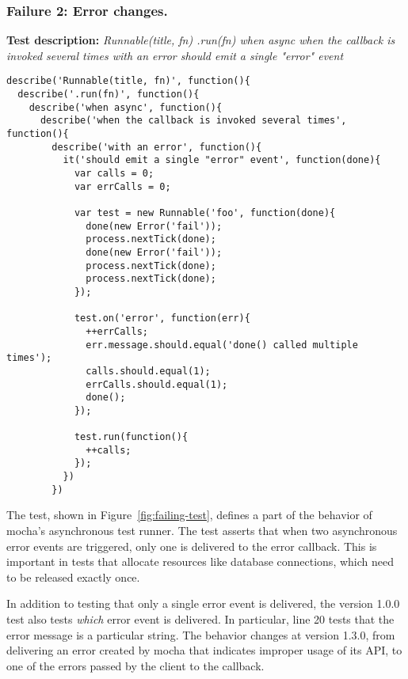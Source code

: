 \subsubsection{Failure 2: Error changes.}
\label{sec:failure2}
{\bf Test description: }
%
{\em Runnable(title, fn) .run(fn) when async when the callback is
  invoked several times with an error should emit a single "error"
  event }

\begin{figure*}
\begin{lstlisting}
describe('Runnable(title, fn)', function(){
  describe('.run(fn)', function(){
    describe('when async', function(){
      describe('when the callback is invoked several times', function(){
        describe('with an error', function(){
          it('should emit a single "error" event', function(done){
            var calls = 0;
            var errCalls = 0;

            var test = new Runnable('foo', function(done){
              done(new Error('fail'));
              process.nextTick(done);
              done(new Error('fail'));
              process.nextTick(done);
              process.nextTick(done);
            });

            test.on('error', function(err){
              ++errCalls;
              err.message.should.equal('done() called multiple times');
              calls.should.equal(1);
              errCalls.should.equal(1);
              done();
            });

            test.run(function(){
              ++calls;
            });
          })
        })
\end{lstlisting}
\caption{A failing mocha ``jsapi'' test}
\label{fig:failing-test}
\end{figure*}

The test, shown in Figure~\ref{fig:failing-test}, defines a
part of the behavior of mocha's asynchronous test runner. The test 
asserts that when two asynchronous error events are triggered, only one
is delivered to the error callback. This is important in tests that
allocate resources like database connections, which need to be released
exactly once.

In addition to testing that only a single error event is delivered,
the version 1.0.0 test also tests {\em which} error event is
delivered. In particular, line 20 tests that the error message is a
particular string. The behavior changes at version 1.3.0, from
delivering an error created by mocha that indicates improper usage of
its API, to one of the errors passed by the client to the callback.

